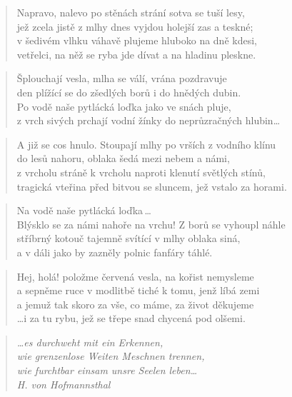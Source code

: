\documentclass{book}
\begin{document}
\begin{verse}
Napravo, nalevo po stěnách strání sotva se tuší lesy,\\
jež zcela jistě z mlhy dnes vyjdou holejší zas a teskné;\\
v šedivém vlhku váhavě plujeme hluboko na dně kdesi,\\
vetřelci, na něž se ryba jde dívat a na hladinu pleskne.
\end{verse}
\begin{verse}
Šplouchají vesla, mlha se válí, vrána pozdravuje\\
den plížící se do zšedlých borů i do hnědých dubin.\\
Po vodě naše pytlácká loďka jako ve snách pluje,\\
z vrch sivých prchají vodní žínky do neprůzračných hlubin\ldots
\end{verse}
\begin{verse}
A již se cos hnulo. Stoupají mlhy po vrších z vodního klínu\\
do lesů nahoru, oblaka šedá mezi nebem a námi,\\
z vrcholu stráně k vrcholu naproti klenutí světlých stínů,\\
tragická vteřina před bitvou se sluncem, jež vstalo za horami.
\end{verse}
\begin{verse}
Na vodě naše pytlácká loďka\,\ldots {}\\
Blýsklo se za námi nahoře na vrchu! Z borů se vyhoupl náhle\\
stříbrný kotouč tajemně svítící v mlhy oblaka siná,\\
a v dáli jako by zazněly polnic fanfáry táhlé.
\end{verse}
\begin{verse}
Hej, holá! položme červená vesla, na kořist nemysleme\\
a sepněme ruce v modlitbě tiché k tomu, jenž líbá zemi\\
a jemuž tak skoro za vše, co máme, za život děkujeme\\
\ldots i za tu rybu, jež se třepe snad chycená pod olšemi.
\end{verse}
\newpage
{}
\begin{verse}
\textit{\ldots es durchweht mit ein Erkennen,\\
wie grenzenlose Weiten Meschnen trennen,\\
wie furchtbar einsam unsre Seelen leben\ldots\\
H. von Hofmannsthal}
\end{verse}
\end{document}
